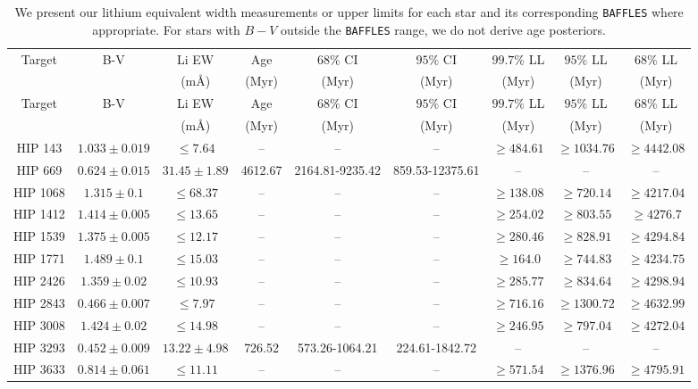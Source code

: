 {\setlength{\tabcolsep}{2pt}\begin{longtable}{|c|c|c|c|c|c|c|c|c|}

\caption{We present our lithium equivalent width measurements or upper limits for each star and its corresponding \texttt{BAFFLES}  where appropriate. For stars with $B-V$ outside the \texttt{BAFFLES} range, we do not derive age posteriors.} \\


\hline
Target & B-V & Li EW & Age & $68\%$ CI& $95\%$ CI & $99.7\%$ LL & $95\%$ LL & $68\%$ LL\\
& & (m\r{A}) & (Myr) & (Myr) & (Myr) & (Myr) & (Myr) & (Myr)\\
\hline
\endfirsthead 
\hline
Target & B-V & Li EW & Age & $68\%$ CI& $95\%$ CI & $99.7\%$ LL & $95\%$ LL & $68\%$ LL\\
& & (m\r{A}) & (Myr) & (Myr) & (Myr) & (Myr) & (Myr) & (Myr)\\
\hline
\endhead
\hline
\endfoot
HIP 143 & $ 1.033 \pm 0.019 $ & $\le 7.64 $ &-- &-- &-- & $\ge 484.61 $ & $\ge 1034.76 $ & $\ge 4442.08 $ \\
HIP 669 & $ 0.624 \pm 0.015 $ & $ 31.45 \pm 1.89 $ & 4612.67 & 2164.81-9235.42 & 859.53-12375.61 &-- &-- &-- \\
HIP 1068 & $ 1.315 \pm 0.1 $ & $\le 68.37 $ &-- &-- &-- & $\ge 138.08 $ & $\ge 720.14 $ & $\ge 4217.04 $ \\
HIP 1412 & $ 1.414 \pm 0.005 $ & $\le 13.65 $ &-- &-- &-- & $\ge 254.02 $ & $\ge 803.55 $ & $\ge 4276.7 $ \\
HIP 1539 & $ 1.375 \pm 0.005 $ & $\le 12.17 $ &-- &-- &-- & $\ge 280.46 $ & $\ge 828.91 $ & $\ge 4294.84 $ \\
HIP 1771 & $ 1.489 \pm 0.1 $ & $\le 15.03 $ &-- &-- &-- & $\ge 164.0 $ & $\ge 744.83 $ & $\ge 4234.75 $ \\
HIP 2426 & $ 1.359 \pm 0.02 $ & $\le 10.93 $ &-- &-- &-- & $\ge 285.77 $ & $\ge 834.64 $ & $\ge 4298.94 $ \\
HIP 2843 & $ 0.466 \pm 0.007 $ & $\le 7.97 $ &-- &-- &-- & $\ge 716.16 $ & $\ge 1300.72 $ & $\ge 4632.99 $ \\
HIP 3008 & $ 1.424 \pm 0.02 $ & $\le 14.98 $ &-- &-- &-- & $\ge 246.95 $ & $\ge 797.04 $ & $\ge 4272.04 $ \\
HIP 3293 & $ 0.452 \pm 0.009 $ & $ 13.22 \pm 4.98 $ & 726.52 & 573.26-1064.21 & 224.61-1842.72 &-- &-- &-- \\
HIP 3633 & $ 0.814 \pm 0.061 $ & $\le 11.11 $ &-- &-- &-- & $\ge 571.54 $ & $\ge 1376.96 $ & $\ge 4795.91 $ \\

\end{longtable}}
